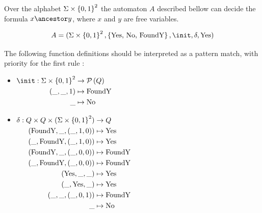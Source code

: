 \documentclass[twoside]{article}
\begin{document}
\begin{lemma}
	Over the alphabet $\Sigma \times \left\{0,1\right\}^2$ the automaton $A$ described bellow can decide the formula $x  \ancestor y $,
	where $x$ and $y$ are free variables.

	\[A = (\Sigma \times \set {0,1}^2, \set {\text {Yes, No, FoundY}},  \init, \delta, \text{Yes})\]

	The following function definitions should be interpreted as a pattern match, with priority for the first rule :

	\begin{itemize}
		\item $\begin{aligned}[t]
				      \init      : \Sigma \times \set{0,1}^2 & \to \parts Q          \\
				      (\_, \_, 1)                            & \mapsto \text{FoundY} \\
				      \_                                     & \mapsto \text{No}
			      \end{aligned} $

		\item $\begin{aligned}[t]
				      \delta               : Q \times Q \times (\Sigma \times \left\{0,1\right\}^2) & \to Q                 \\
				      (\text{FoundY}, \_, (\_,1,0))                                         & \mapsto \text{Yes}    \\
				      (\_, \text{FoundY}, (\_,1,0))                                         & \mapsto \text{Yes}    \\
				      (\text{FoundY}, \_, (\_,0,0))                                         & \mapsto \text{FoundY} \\
				      (\_, \text{FoundY}, (\_,0,0))                                         & \mapsto \text{FoundY} \\
				      (\text{Yes}, \_, \_)                                                  & \mapsto \text{Yes}    \\
				      (\_, \text{Yes}, \_)                                                  & \mapsto \text{Yes}    \\
				      (\_, \_, (\_, 0, 1))                                                  & \mapsto \text{FoundY} \\
				      \_                                                                    & \mapsto \text{No}
			      \end{aligned}$
	\end{itemize}
\end{lemma}
\end{document}
